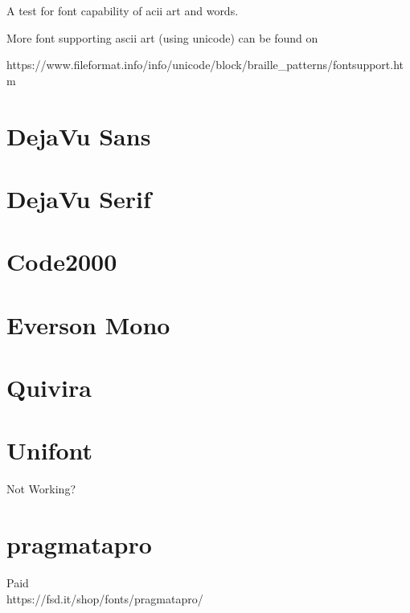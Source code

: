 \documentclass[lang=en,a4paper,bibend=bibtex]{elegantcs}
\begin{document}
A test for font capability of acii art and words.

More font supporting ascii art (using unicode) can be found on

https://www.fileformat.info/info/unicode/block/braille\_patterns/fontsupport.htm

\section{DejaVu Sans}
\setmonofont{DejaVu Sans}


\section{DejaVu Serif}
\setmonofont{DejaVu Serif}


\section{Code2000}
\setmonofont{Code2000}


\section{Everson Mono}
\setmonofont{Everson Mono}


\section{Quivira}
\setmonofont{Quivira}


\section{Unifont}
Not Working?

\section{pragmatapro}
Paid\\
https://fsd.it/shop/fonts/pragmatapro/
\end{document}
